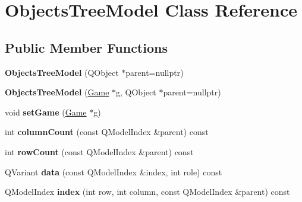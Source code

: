 \hypertarget{class_objects_tree_model}{\section{\-Objects\-Tree\-Model \-Class \-Reference}
\label{class_objects_tree_model}
}
\subsection*{\-Public \-Member \-Functions}
\begin{DoxyCompactItemize}
\item 
\hypertarget{class_objects_tree_model_a4cc5d9d4f4a979715d93841b8d76c996}{{\bfseries \-Objects\-Tree\-Model} (\-Q\-Object $\ast$parent=nullptr)}\label{class_objects_tree_model_a4cc5d9d4f4a979715d93841b8d76c996}

\item 
\hypertarget{class_objects_tree_model_a0796ddf3bdd9fae95ac199b72e994465}{{\bfseries \-Objects\-Tree\-Model} (\hyperlink{class_game}{\-Game} $\ast$g, \-Q\-Object $\ast$parent=nullptr)}\label{class_objects_tree_model_a0796ddf3bdd9fae95ac199b72e994465}

\item 
\hypertarget{class_objects_tree_model_ad8d730a8f686c922ecdfe4d33bf2c9a8}{void {\bfseries set\-Game} (\hyperlink{class_game}{\-Game} $\ast$g)}\label{class_objects_tree_model_ad8d730a8f686c922ecdfe4d33bf2c9a8}

\item 
\hypertarget{class_objects_tree_model_aabbf78c8e13f3c651f75e5d32c16ba84}{int {\bfseries column\-Count} (const \-Q\-Model\-Index \&parent) const }\label{class_objects_tree_model_aabbf78c8e13f3c651f75e5d32c16ba84}

\item 
\hypertarget{class_objects_tree_model_aa7740390e180a7663e3341a5aa56c49b}{int {\bfseries row\-Count} (const \-Q\-Model\-Index \&parent) const }\label{class_objects_tree_model_aa7740390e180a7663e3341a5aa56c49b}

\item 
\hypertarget{class_objects_tree_model_a98fe0687618c87c84f5519c92d729aa0}{\-Q\-Variant {\bfseries data} (const \-Q\-Model\-Index \&index, int role) const }\label{class_objects_tree_model_a98fe0687618c87c84f5519c92d729aa0}

\item 
\hypertarget{class_objects_tree_model_a8c9f9980e0268c7125f97ce9e45e026d}{\-Q\-Model\-Index {\bfseries index} (int row, int column, const \-Q\-Model\-Index \&parent) const }\label{class_objects_tree_model_a8c9f9980e0268c7125f97ce9e45e026d}


\end{DoxyCompactItemize}
